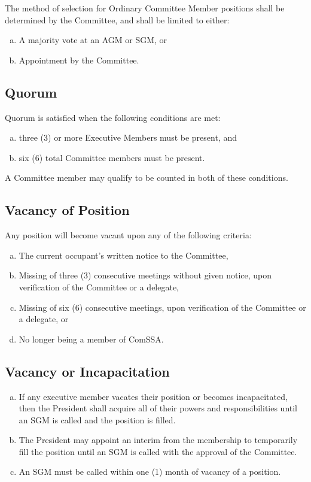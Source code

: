 \documentclass[a4paper,12pt]{article}
\begin{document}
The method of selection for Ordinary Committee Member positions shall be determined by the Committee, and shall be limited to either:

\begin{enumerate}[a)]
	\item A majority vote at an AGM or SGM, or
	\item Appointment by the Committee.
\end{enumerate}

\subsection{Quorum}

Quorum is satisfied when the following conditions are met:

\begin{enumerate}[a)]
    \item three (3) or more Executive Members must be present, and
    \item six (6) total Committee members must be present.
\end{enumerate}

A Committee member may qualify to be counted in both of these conditions.

\subsection{Vacancy of Position}

Any position will become vacant upon any of the following criteria:

\begin{enumerate}[a)]
	\item The current occupant's written notice to the Committee,
	\item Missing of three (3) consecutive meetings without given notice, upon verification of the Committee or a delegate,
	\item Missing of six (6) consecutive meetings, upon verification of the Committee or a delegate, or
	\item No longer being a member of ComSSA.
\end{enumerate}

\subsection{Vacancy or Incapacitation}

\begin{enumerate}[a)]
	\item If any executive member vacates their position or becomes incapacitated, then the President shall acquire all of their powers and responsibilities until an SGM is called and the position is filled.
	\item The President may appoint an interim from the membership to temporarily fill the position until an SGM is called with the approval of the Committee.
	\item An SGM must be called within one (1) month of vacancy of a position.
\end{enumerate}
\end{document}
